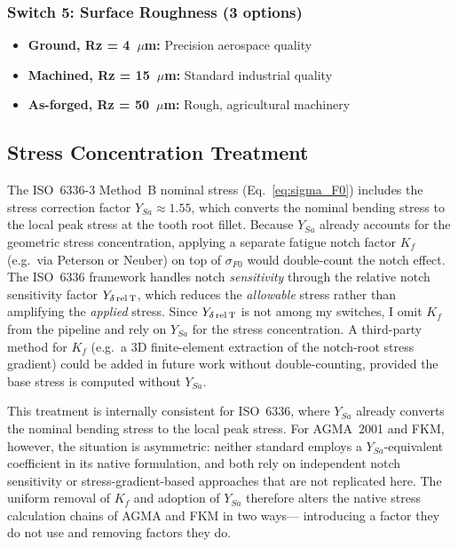 \documentclass[twocolumn,12pt,a4paper]{article}
\begin{document}
\subsubsection{Switch 5: Surface Roughness (3 options)}

\begin{itemize}
  \item \textbf{Ground, Rz = 4~$\mu$m:} Precision aerospace quality
  \item \textbf{Machined, Rz = 15~$\mu$m:} Standard industrial quality
  \item \textbf{As-forged, Rz = 50~$\mu$m:} Rough, agricultural machinery
\end{itemize}

\subsection{Stress Concentration Treatment}
\label{sec:stress_concentration}

The ISO~6336-3 Method~B nominal stress (Eq.~\ref{eq:sigma_F0}) includes
the stress correction factor $Y_{Sa} \approx 1.55$, which converts the
nominal bending stress to the local peak stress at the tooth root
fillet. Because $Y_{Sa}$ already accounts for the geometric stress
concentration, applying a separate fatigue notch factor $K_f$ (e.g.\
via Peterson or Neuber) on top of $\sigma_{F0}$ would double-count the
notch effect. The ISO~6336 framework handles notch \emph{sensitivity}
through the relative notch sensitivity factor $Y_{\delta\,\rm rel\,T}$,
which reduces the \emph{allowable} stress rather than amplifying the
\emph{applied} stress. Since $Y_{\delta\,\rm rel\,T}$ is not among my
switches, I omit $K_f$ from the pipeline and rely on $Y_{Sa}$ for the
stress concentration. A third-party method for $K_f$ (e.g.\ a 3D
finite-element extraction of the notch-root stress gradient) could be
added in future work without double-counting, provided the base stress
is computed without $Y_{Sa}$.

This treatment is internally consistent for ISO~6336, where $Y_{Sa}$
already converts the nominal bending stress to the local peak stress.
For AGMA~2001 and FKM, however, the situation is asymmetric: neither
standard employs a $Y_{Sa}$-equivalent coefficient in its native
formulation, and both rely on independent notch sensitivity or
stress-gradient-based approaches that are not replicated here. The
uniform removal of $K_f$ and adoption of $Y_{Sa}$ therefore alters the
native stress calculation chains of AGMA and FKM in two ways---%
introducing a factor they do not use and removing factors they do.
\end{document}

